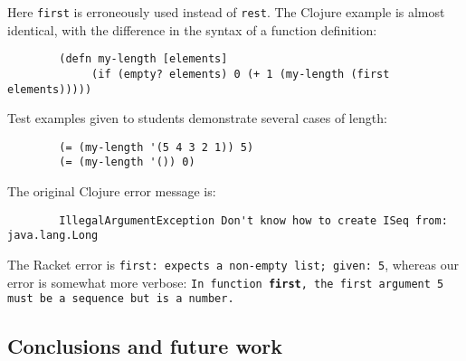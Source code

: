 \documentclass[submission,copyright,creativecommons]{eptcs}
\newcommand{\allcomments}[1]{{#1}}
\newcommand{\hfcomment}[1]{\textcolor{Teal}{\allcomments{Henry: {#1}}}}
\begin{document}
Here {\tt first} is erroneously used instead of {\tt rest}. The Clojure example is almost identical, with the difference in the syntax of a function definition: 
\begin{verbatim}
		(defn my-length [elements]
 			 (if (empty? elements) 0 (+ 1 (my-length (first elements)))))
\end{verbatim}
Test examples given to students demonstrate several cases of length: 
\begin{verbatim}
		(= (my-length '(5 4 3 2 1)) 5)
		(= (my-length '()) 0)
\end{verbatim}
The original Clojure error message is: 
\begin{verbatim}
		IllegalArgumentException Don't know how to create ISeq from: java.lang.Long 
\end{verbatim}
The Racket error is {\tt first: expects a non-empty list; given: 5}, whereas our error is somewhat more verbose: 
{\tt In function {\bf first}, the first argument 5 must be a sequence but is a number.}


	

\subsection{Conclusions and future work}\label{sec:future}



\end{document}
